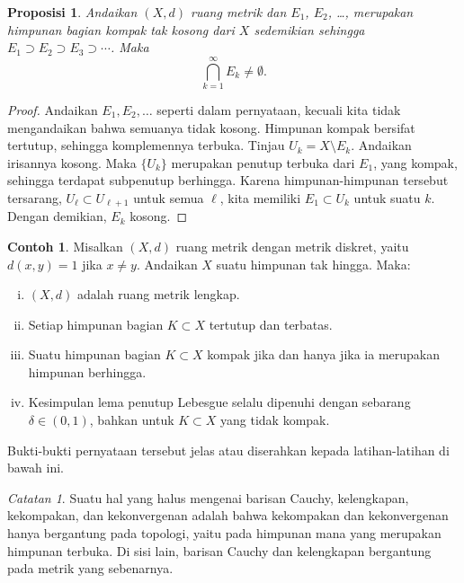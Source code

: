 \documentclass[12pt,openany]{book}
\theoremstyle{plain}
\newtheorem{prop}[thm]{Proposisi}
\theoremstyle{remark}
\newtheorem{remark}[thm]{Catatan}
\theoremstyle{definition}
\theoremstyle{exercise}
\theoremstyle{example}
\newtheorem{example}[thm]{Contoh}
\begin{document}
\begin{prop}
Andaikan $(X,d)$ ruang metrik
dan $E_1$, $E_2$, \ldots, merupakan
himpunan bagian kompak tak kosong dari $X$ sedemikian sehingga
$E_1 \supset E_2 \supset E_3 \supset \cdots$. Maka
\begin{equation*}
\bigcap_{k=1}^\infty E_k \neq \emptyset .
\end{equation*}
\end{prop}

\begin{proof}
Andaikan $E_1,E_2,\ldots$ seperti dalam pernyataan, kecuali kita tidak
mengandaikan bahwa semuanya tidak kosong.
Himpunan kompak bersifat tertutup, sehingga komplemennya terbuka. Tinjau
$U_k = X \setminus E_k$. Andaikan irisannya kosong.
Maka $\{ U_k \}$ merupakan penutup terbuka dari $E_1$, yang kompak,
sehingga terdapat subpenutup berhingga.
Karena himpunan-himpunan tersebut tersarang,
$U_\ell \subset U_{\ell+1}$ untuk semua $\ell$,
kita memiliki $E_1 \subset U_k$ untuk suatu $k$. Dengan demikian, $E_k$ kosong.
\end{proof}

\begin{example}
Misalkan $(X,d)$ ruang metrik dengan metrik diskret, yaitu $d(x,y) = 1$
jika $x \neq y$. Andaikan
$X$ suatu himpunan tak hingga. Maka:
\begin{enumerate}[(i)]
\item $(X,d)$ adalah ruang metrik lengkap.
\item Setiap himpunan bagian $K \subset X$ tertutup dan terbatas.
\item Suatu himpunan bagian $K \subset X$ kompak jika dan hanya jika ia merupakan himpunan berhingga.
\item Kesimpulan lema penutup Lebesgue selalu dipenuhi
dengan sebarang $\delta \in (0,1)$, bahkan untuk $K \subset X$ yang tidak kompak.
\end{enumerate}
Bukti-bukti
pernyataan tersebut jelas atau diserahkan kepada latihan-latihan
di bawah ini.
\end{example}

\begin{remark}
Suatu hal yang halus mengenai barisan Cauchy, kelengkapan, kekompakan,
dan kekonvergenan adalah bahwa kekompakan dan kekonvergenan hanya bergantung pada
topologi, yaitu pada himpunan mana yang merupakan himpunan terbuka. Di sisi lain,
barisan Cauchy dan kelengkapan bergantung pada metrik yang sebenarnya.
\end{remark}
\end{document}
